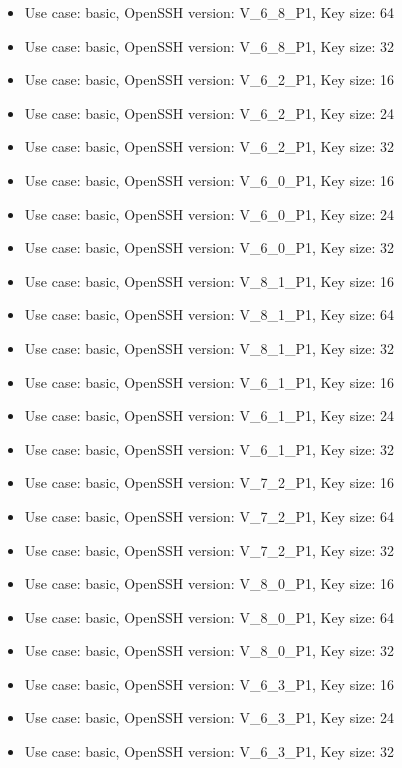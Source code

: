 \begin{itemize}
            \item Use case: basic, OpenSSH version: V\_6\_8\_P1, Key size: 64
            \item Use case: basic, OpenSSH version: V\_6\_8\_P1, Key size: 32
            \item Use case: basic, OpenSSH version: V\_6\_2\_P1, Key size: 16
            \item Use case: basic, OpenSSH version: V\_6\_2\_P1, Key size: 24
            \item Use case: basic, OpenSSH version: V\_6\_2\_P1, Key size: 32
            \item Use case: basic, OpenSSH version: V\_6\_0\_P1, Key size: 16
            \item Use case: basic, OpenSSH version: V\_6\_0\_P1, Key size: 24
            \item Use case: basic, OpenSSH version: V\_6\_0\_P1, Key size: 32
            \item Use case: basic, OpenSSH version: V\_8\_1\_P1, Key size: 16
            \item Use case: basic, OpenSSH version: V\_8\_1\_P1, Key size: 64
            \item Use case: basic, OpenSSH version: V\_8\_1\_P1, Key size: 32
            \item Use case: basic, OpenSSH version: V\_6\_1\_P1, Key size: 16
            \item Use case: basic, OpenSSH version: V\_6\_1\_P1, Key size: 24
            \item Use case: basic, OpenSSH version: V\_6\_1\_P1, Key size: 32
            \item Use case: basic, OpenSSH version: V\_7\_2\_P1, Key size: 16
            \item Use case: basic, OpenSSH version: V\_7\_2\_P1, Key size: 64
            \item Use case: basic, OpenSSH version: V\_7\_2\_P1, Key size: 32
            \item Use case: basic, OpenSSH version: V\_8\_0\_P1, Key size: 16
            \item Use case: basic, OpenSSH version: V\_8\_0\_P1, Key size: 64
            \item Use case: basic, OpenSSH version: V\_8\_0\_P1, Key size: 32
            \item Use case: basic, OpenSSH version: V\_6\_3\_P1, Key size: 16
            \item Use case: basic, OpenSSH version: V\_6\_3\_P1, Key size: 24
            \item Use case: basic, OpenSSH version: V\_6\_3\_P1, Key size: 32

\end{itemize}
